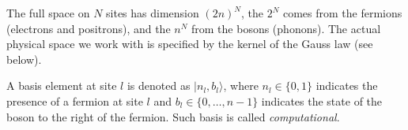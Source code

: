 	
	The full space on $N$ sites has dimension $(2n)^{N}$, the $2^N$ comes from the fermions (electrons and positrons), 
	and the $n^N$ from the bosons (phonons). The actual physical space we work with is specified by the kernel of the Gauss law (see below).
	
	A basis element at site $l$ is denoted as $|n_l, b_l\rangle$, where $n_l \in \{0,1\}$ indicates the presence of a fermion at site $l$ and $b_l \in \{0,\ldots,n-1\}$ indicates the state of the boson to the right of the fermion. Such basis is called \emph{computational}.
	
